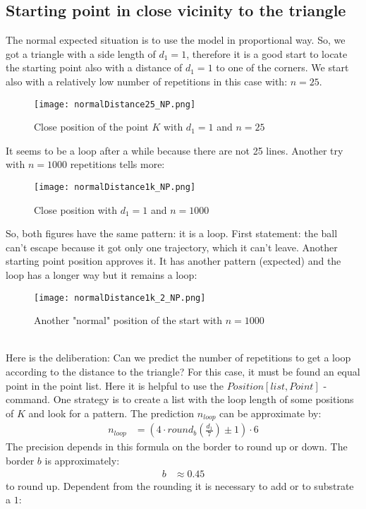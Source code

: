 \documentclass[11pt,a4paper]{article}
\begin{document}
 \subsection{Starting point in close vicinity to the triangle}
The normal expected situation is to use the model in proportional way. So, we got a triangle with a side length of \(d_1=1\), therefore it is a good start to locate the starting point also with a distance of \(d_1=1\) to one of the corners. We start also with a relatively low number of repetitions in this case with: \(n=25\).
\begin{figure}[h]
\centering
\texttt{[image: normalDistance25\_NP.png]}
\caption{Close position of the point \(K\) with \(d_1=1\) and \(n=25\)}
\end{figure}
It seems to be a loop after a while because there are not 25 lines. Another try with \(n=1000\) repetitions tells more:
\begin{figure}[h]
\centering
\texttt{[image: normalDistance1k\_NP.png]}
\caption{Close position with \(d_1=1\) and \(n=1000\)}
\end{figure}
So, both figures have the same pattern: it is a loop. First statement: the ball can’t escape because it got only one trajectory, which it can’t leave. Another starting point position approves it. It has another pattern (expected) and the loop has a longer way but it remains a loop:
\begin{figure}[h]
\centering
\texttt{[image: normalDistance1k\_2\_NP.png]}
\caption{Another "normal" position of the start with \(n=1000\)}
\end{figure}
\\Here is the deliberation: Can we predict the number of repetitions to get a loop according to the distance to the triangle? For this case, it must be found an equal point in the point list. Here it is helpful to use the \(Position[list, {Point}]\) -command. One strategy is to create a list with the loop length of some positions of \(K\) and look for a pattern. The prediction \(n_{loop}\) can be approximate by:
\begin{align}
\label{approxN}n_{loop}&= \left(4 \cdot round_b \left( \frac{d_1}{7} \right) \pm 1\right) \cdot 6
\end{align}
The precision depends in this formula on the border to round up or down. The border \(b\) is approximately:
\begin{align}
b&\approx 0.45
\end{align} 
to round up. Dependent from the rounding it is necessary to add or to substrate a \(1\):
\end{document}
